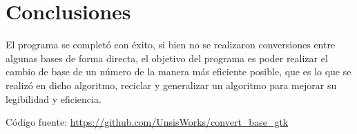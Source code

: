 \documentclass[letterpaper,12pt]{extarticle}%
\begin{document}
	    \section{Conclusiones}
		El programa se completó con éxito, si bien no se realizaron conversiones entre algunas bases
		de forma directa, el objetivo del programa es poder realizar el cambio de base de un número de
		la manera más eficiente posible, que es lo que se realizó en dicho algoritmo, reciclar y generalizar
		un algoritmo para mejorar su legibilidad y eficiencia.
		
		Código fuente: \url{https://github.com/UnsisWorks/convert_base_gtk}
    
	\newpage
	
	


	\cfoot{\LaTeX}
\end{document}
